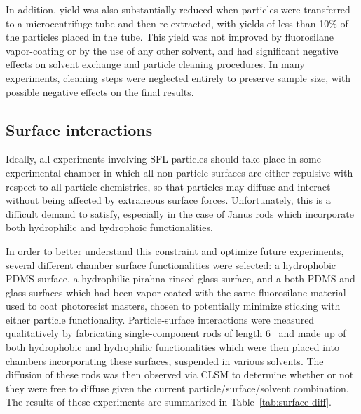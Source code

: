 In addition, yield was also substantially reduced when particles were transferred to a microcentrifuge tube
and then re-extracted, with yields of less than 10\% of the particles placed in the tube.  This yield was
not improved by fluorosilane vapor-coating or by the use of any other solvent, and had significant
negative effects on solvent exchange and particle cleaning procedures.  In many experiments, cleaning 
steps were neglected entirely to preserve sample size, with possible negative effects on the final results.

\subsection{Surface interactions}
\label{sec:surface-interact}

Ideally, all experiments involving SFL particles should take place in some experimental
chamber in which all non-particle surfaces are either repulsive with respect to all
particle chemistries, so that particles may diffuse and interact without 
being affected by extraneous surface forces.  Unfortunately, this is a difficult demand to 
satisfy, especially in the case of Janus rods which incorporate both hydrophilic and 
hydrophoic functionalities. 

In order to better understand this constraint and optimize future experiments, several different 
chamber surface
functionalities were selected: a hydrophobic PDMS surface, a hydrophilic pirahna-rinsed glass surface,
and a both PDMS and glass surfaces which had been vapor-coated with the same fluorosilane material used
to coat photoresist masters, chosen to potentially minimize sticking with either particle functionality.
Particle-surface interactions were measured qualitatively by fabricating single-component rods
of length 6 \microns~and made up of both
hydrophobic and hydrophilic functionalities which were then placed into chambers incorporating these
surfaces, suspended in various solvents.  The diffusion of these rods was then observed via CLSM to 
determine whether or not they were free to diffuse given the current particle/surface/solvent combination.
The results of these experiments are summarized in Table~\ref{tab:surface-diff}.

